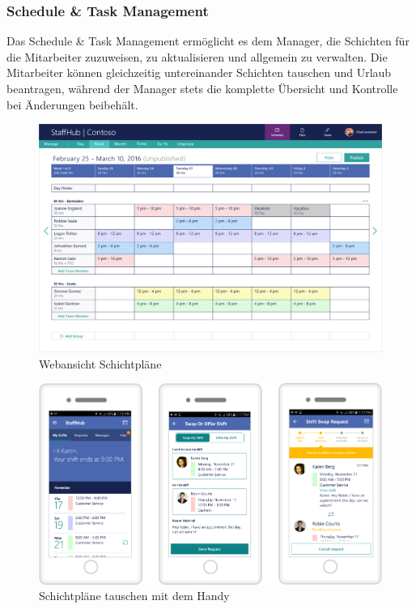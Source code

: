 \subsubsection{Schedule \& Task Management}
Das Schedule \& Task Management ermöglicht es dem Manager, die Schichten für die Mitarbeiter zuzuweisen, zu aktualisieren und allgemein zu verwalten. Die Mitarbeiter können gleichzeitig untereinander Schichten tauschen und Urlaub beantragen, während der Manager stets die komplette Übersicht und Kontrolle bei Änderungen beibehält. 

\begin{figure}[H] 
\centering 
\includegraphics[scale=0.48]{images/schedule} 
\caption[Webansicht Schichtpläne]{Webansicht Schichtpläne\protect} 
\label{ws} 
\end{figure}

\begin{figure}[H] 
\centering 
\includegraphics[scale=0.48]{images/schedulemobile} 
\caption[Schichtpläne tauschen mit dem Handy]{Schichtpläne tauschen mit dem Handy\protect} 
\label{ws} 
\end{figure}

